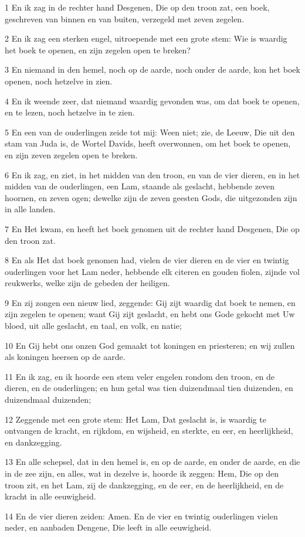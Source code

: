 \par 1 En ik zag in de rechter hand Desgenen, Die op den troon zat, een boek, geschreven van binnen en van buiten, verzegeld met zeven zegelen.
\par 2 En ik zag een sterken engel, uitroepende met een grote stem: Wie is waardig het boek te openen, en zijn zegelen open te breken?
\par 3 En niemand in den hemel, noch op de aarde, noch onder de aarde, kon het boek openen, noch hetzelve in zien.
\par 4 En ik weende zeer, dat niemand waardig gevonden was, om dat boek te openen, en te lezen, noch hetzelve in te zien.
\par 5 En een van de ouderlingen zeide tot mij: Ween niet; zie, de Leeuw, Die uit den stam van Juda is, de Wortel Davids, heeft overwonnen, om het boek te openen, en zijn zeven zegelen open te breken.
\par 6 En ik zag, en ziet, in het midden van den troon, en van de vier dieren, en in het midden van de ouderlingen, een Lam, staande als geslacht, hebbende zeven hoornen, en zeven ogen; dewelke zijn de zeven geesten Gods, die uitgezonden zijn in alle landen.
\par 7 En Het kwam, en heeft het boek genomen uit de rechter hand Desgenen, Die op den troon zat.
\par 8 En als Het dat boek genomen had, vielen de vier dieren en de vier en twintig ouderlingen voor het Lam neder, hebbende elk citeren en gouden fiolen, zijnde vol reukwerks, welke zijn de gebeden der heiligen.
\par 9 En zij zongen een nieuw lied, zeggende: Gij zijt waardig dat boek te nemen, en zijn zegelen te openen; want Gij zijt geslacht, en hebt ons Gode gekocht met Uw bloed, uit alle geslacht, en taal, en volk, en natie;
\par 10 En Gij hebt ons onzen God gemaakt tot koningen en priesteren; en wij zullen als koningen heersen op de aarde.
\par 11 En ik zag, en ik hoorde een stem veler engelen rondom den troon, en de dieren, en de ouderlingen; en hun getal was tien duizendmaal tien duizenden, en duizendmaal duizenden;
\par 12 Zeggende met een grote stem: Het Lam, Dat geslacht is, is waardig te ontvangen de kracht, en rijkdom, en wijsheid, en sterkte, en eer, en heerlijkheid, en dankzegging.
\par 13 En alle schepsel, dat in den hemel is, en op de aarde, en onder de aarde, en die in de zee zijn, en alles, wat in dezelve is, hoorde ik zeggen: Hem, Die op den troon zit, en het Lam, zij de dankzegging, en de eer, en de heerlijkheid, en de kracht in alle eeuwigheid.
\par 14 En de vier dieren zeiden: Amen. En de vier en twintig ouderlingen vielen neder, en aanbaden Dengene, Die leeft in alle eeuwigheid.

